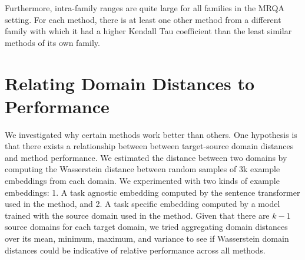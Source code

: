 Furthermore, intra-family ranges are quite large for all families in the MRQA setting. 
For each method, there is at least one other method from a different family with which it had a higher Kendall Tau coefficient than the least similar methods of its own family.

\section{Relating Domain Distances to Performance}
\label{appendix:domain-distances}

    
    
We investigated why certain methods work better than others. 
One hypothesis is that there exists a relationship between between target-source domain distances and method performance. 
We estimated the distance between two domains by computing the Wasserstein distance between random samples of 3k example embeddings from each domain. 
We experimented with two kinds of example embeddings: 1. A task agnostic embedding computed by the sentence transformer used in the \knn{} method, and 2. A task specific embedding computed by a model trained with the source domain used in the \dals{} method. 
Given that there are $k - 1$ source domains for each target domain, we tried aggregating domain distances over its mean, minimum, maximum, and variance to see if Wasserstein domain distances could be indicative of relative performance across all methods.

